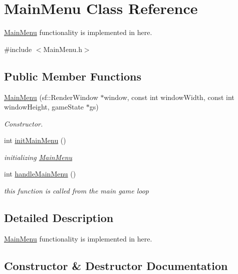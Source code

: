 \hypertarget{classMainMenu}{}\section{Main\+Menu Class Reference}
\label{classMainMenu}


\hyperlink{classMainMenu}{Main\+Menu} functionality is implemented in here.  




{\ttfamily \#include $<$Main\+Menu.\+h$>$}

\subsection*{Public Member Functions}
\begin{DoxyCompactItemize}
\item 
\hyperlink{classMainMenu_a7d77dec9912147828eafc561a908ffed}{Main\+Menu} (sf\+::\+Render\+Window $\ast$window, const int window\+Width, const int window\+Height, game\+State $\ast$gs)
\begin{DoxyCompactList}\small\item\em Constructor. \end{DoxyCompactList}\item 
int \hyperlink{classMainMenu_a3c15af2faff50d642ab6920e2fdcd297}{init\+Main\+Menu} ()
\begin{DoxyCompactList}\small\item\em initializing \hyperlink{classMainMenu}{Main\+Menu} \end{DoxyCompactList}\item 
int \hyperlink{classMainMenu_ab849dbe0f56adfed51f58e80a536c5f8}{handle\+Main\+Menu} ()
\begin{DoxyCompactList}\small\item\em this function is called from the main game loop \end{DoxyCompactList}\end{DoxyCompactItemize}


\subsection{Detailed Description}
\hyperlink{classMainMenu}{Main\+Menu} functionality is implemented in here. 

\subsection{Constructor \& Destructor Documentation}
\mbox{\label{classMainMenu_a7d77dec9912147828eafc561a908ffed}} 
